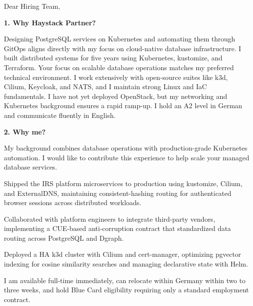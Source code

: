 \documentclass[11pt,a4paper]{coverletter}
\begin{document}

\opening{Dear Hiring Team,}

\vspace{8pt}\noindent\textbf{1. Why Haystack Partner?}\par\vspace{3pt}

Designing PostgreSQL services on Kubernetes and automating them through GitOps aligns directly with my focus on cloud-native database infrastructure. I built distributed systems for five years using Kubernetes, kustomize, and Terraform. Your focus on scalable database operations matches my preferred technical environment. I work extensively with open-source suites like k3d, Cilium, Keycloak, and NATS, and I maintain strong Linux and IaC fundamentals. I have not yet deployed OpenStack, but my networking and Kubernetes background ensures a rapid ramp-up. I hold an A2 level in German and communicate fluently in English.

\vspace{8pt}\noindent\textbf{2. Why me?}\par\vspace{3pt}

My background combines database operations with production-grade Kubernetes automation. I would like to contribute this experience to help scale your managed database services.

\bullets

  \item Shipped the IRS platform microservices to production using kustomize, Cilium, and ExternalDNS, maintaining consistent-hashing routing for authenticated browser sessions across distributed workloads.

  \item Collaborated with platform engineers to integrate third-party vendors, implementing a CUE-based anti-corruption contract that standardized data routing across PostgreSQL and Dgraph.

  \item Deployed a HA k3d cluster with Cilium and cert-manager, optimizing pgvector indexing for cosine similarity searches and managing declarative state with Helm.

\bulletsend

I am available full-time immediately, can relocate within Germany within two to three weeks, and hold Blue Card eligibility requiring only a standard employment contract.
\end{document}
